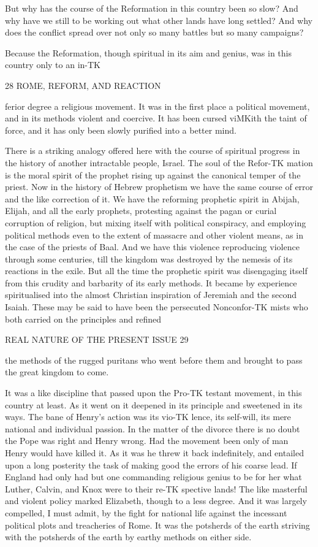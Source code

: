 \documentclass[12pt,a5paper,oneside]{book}
\begin{document}
But why has the course of the Reformation in this 
country been so slow? And why have we still to be 
working out what other lands have long settled? 
And why does the conflict spread over not only so 
many battles but so many campaigns? 

Because the Reformation, though spiritual in its 
aim and genius, was in this country only to an in-TK



28 ROME, REFORM, AND REACTION 

ferior degree a religious movement. It was in the 
first place a political movement, and in its methods 
violent and coercive. It has been cursed viMKith the 
taint of force, and it has only been slowly purified 
into a better mind. 

There is a striking analogy offered here with the 
course of spiritual progress in the history of another 
intractable people, Israel. The soul of the Refor-TK
mation is the moral spirit of the prophet rising up 
against the canonical temper of the priest. Now in 
the history of Hebrew prophetism we have the same 
course of error and the like correction of it. We 
have the reforming prophetic spirit in Abijah, Elijah, 
and all the early prophets, protesting against the pagan 
or curial corruption of religion, but mixing itself with 
political conspiracy, and employing political methods 
even to the extent of massacre and other violent 
means, as in the case of the priests of Baal. And we 
have this violence reproducing violence through some 
centuries, till the kingdom was destroyed by the 
nemesis of its reactions in the exile. But all the time 
the prophetic spirit was disengaging itself from this 
crudity and barbarity of its early methods. It became 
by experience spiritualised into the almost Christian 
inspiration of Jeremiah and the second Isaiah. These 
may be said to have been the persecuted Nonconfor-TK
mists who both carried on the principles and refined 



REAL NATURE OF THE PRESENT ISSUE 29 

the methods of the rugged puritans who went before 
them and brought to pass the great kingdom to come. 

It was a like discipline that passed upon the Pro-TK
testant movement, in this country at least. As it 
went on it deepened in its principle and sweetened in 
its ways. The bane of Henry's action was its vio-TK
lence, its self-will, its mere national and individual 
passion. In the matter of the divorce there is no 
doubt the Pope was right and Henry wrong. Had 
the movement been only of man Henry would have 
killed it. As it was he threw it back indefinitely, and 
entailed upon a long posterity the task of making good 
the errors of his coarse lead. If England had only 
had but one commanding religious genius to be for her 
what Luther, Calvin, and Knox were to their re-TK
spective lands! The like masterful and violent policy 
marked Elizabeth, though to a less degree. And it 
was largely compelled, I must admit, by the fight for 
national life against the incessant political plots and 
treacheries of Rome. It was the potsherds of the 
earth striving with the potsherds of the earth by 
earthy methods on either side. 
\end{document}
